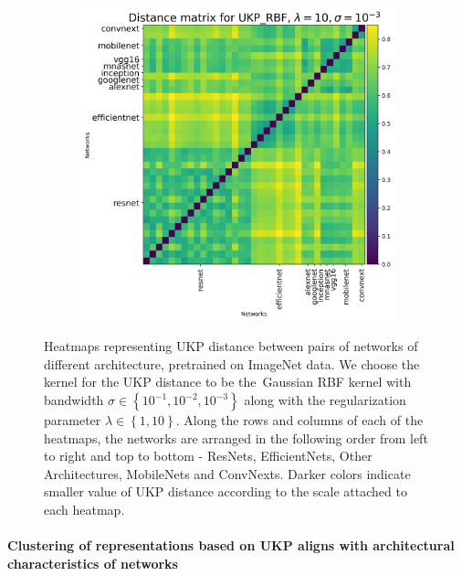 \documentclass{article}
\theoremstyle{plain}
\newcommand{\metricstname}{UKP }
\begin{document}
\begin{figure}[!h]
\begin{subfigure}[b]{0.3\textwidth}
    \end{subfigure}
    \hfill
    \begin{subfigure}[b]{0.3\textwidth}
        \includegraphics[width=\textwidth]{Appendix figures/imagenet_experiments/Heatmaps final/Heatmap for UKP_dist_RBF_1.000000e+01_1.000000e-03.png}
    \end{subfigure}
    
     \caption{Heatmaps representing \metricstname distance between pairs of networks of different architecture, pretrained on ImageNet data. We choose the kernel for the \metricstname distance to be the Gaussian RBF kernel with bandwidth $\sigma \in \left\{10^{-1},10^{-2},10^{-3}\right\}$ along with the regularization parameter $\lambda \in \left\{1,10\right\}$. Along the rows and columns of each of the heatmaps, the networks are arranged in the following order from left to right and top to bottom - ResNets, EfficientNets, Other Architectures, MobileNets and ConvNexts. Darker colors indicate smaller value of \metricstname distance according to the scale attached to each heatmap.}
    \label{ImageNet heatmaps}
\end{figure}

\paragraph{Clustering of representations based on UKP aligns with architectural characteristics of networks}
\end{document}
